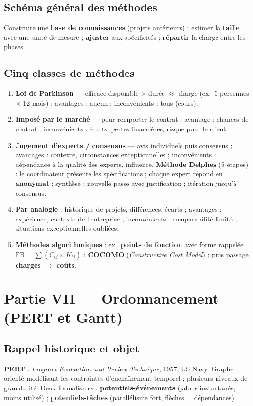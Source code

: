 \documentclass[11pt,a4paper]{article}
\begin{document}
\subsection{Schéma général des méthodes}
Construire une \textbf{base de connaissances} (projets antérieurs) ; estimer la \textbf{taille} avec une unité de mesure ; \textbf{ajuster} aux spécificités ; \textbf{répartir} la charge entre les phases.

\subsection{Cinq classes de méthodes}
\begin{enumerate}[nosep]
  \item \textbf{Loi de Parkinson} — efficace disponible $\times$ durée $\approx$ charge (ex.\ 5 personnes $\times$ 12 mois) ; avantages : aucun ; inconvénients : tous (cours).
  \item \textbf{Imposé par le marché} — pour remporter le contrat ; avantage : chances de contrat ; inconvénients : écarts, pertes financières, risque pour le client.
  \item \textbf{Jugement d'experts / consensus} — avis individuels puis consensus ; avantages : contexte, circonstances exceptionnelles ; inconvénients : dépendance à la qualité des experts, influence. \textbf{Méthode Delphes} (5 étapes) : le coordinateur présente les spécifications ; chaque expert répond en \textbf{anonymat} ; synthèse ; nouvelle passe avec justification ; itération jusqu'à consensus.
  \item \textbf{Par analogie} : historique de projets, différences, écarts ; avantages : expérience, contexte de l'entreprise ; inconvénients : comparabilité limitée, situations exceptionnelles oubliées.
  \item \textbf{Méthodes algorithmiques} : ex.\ \textbf{points de fonction} avec forme rappelée $\mathrm{FB} = \sum (C_{ij} \times K_{ij})$ ; \textbf{COCOMO} (\emph{Constructive Cost Model}) ; puis passage \textbf{charges $\rightarrow$ coûts}.
\end{enumerate}

\section{Partie VII — Ordonnancement (PERT et Gantt)}

\subsection{Rappel historique et objet}
\textbf{PERT} : \emph{Program Evaluation and Review Technique}, 1957, US Navy. Graphe orienté modélisant les contraintes d'enchaînement temporel ; plusieurs niveaux de granularité. Deux formalismes : \textbf{potentiels-événements} (jalons instantanés, moins utilisé) ; \textbf{potentiels-tâches} (parallélisme fort, flèches = dépendances).
\end{document}
